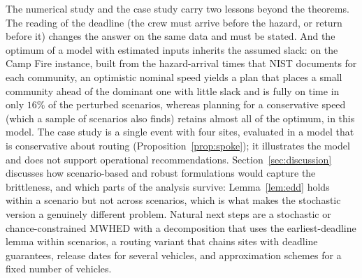 \documentclass[pdflatex,sn-mathphys-ay]{sn-jnl}
\theoremstyle{thmstyleone}
\theoremstyle{thmstyletwo}
\theoremstyle{thmstylethree}
\begin{document}
The numerical study and the case study carry two lessons beyond the
theorems. The reading of the deadline (the crew must arrive before the
hazard, or return before it) changes the answer on the same data and must
be stated. And the optimum of a model with estimated inputs inherits the
assumed slack: on the Camp Fire instance, built from the hazard-arrival
times that NIST documents for each community, an optimistic nominal speed
yields a plan that places a small community ahead of the dominant one with
little slack and is fully on time in only $16\%$ of the perturbed
scenarios, whereas planning for a conservative speed (which a sample of
scenarios also finds) retains almost all of the optimum, in this model. The case
study is a single event with four sites, evaluated in a model that is
conservative about routing (Proposition~\ref{prop:spoke}); it
illustrates the model and does not support operational recommendations.
Section~\ref{sec:discussion} discusses how scenario-based and robust
formulations would capture the brittleness, and which parts of the
analysis survive: Lemma~\ref{lem:edd} holds within a scenario but not
across scenarios, which is what makes the stochastic version a genuinely
different problem. Natural next steps are a stochastic or
chance-constrained MWHED with a decomposition that uses the
earliest-deadline lemma within scenarios, a routing variant that chains
sites with deadline guarantees, release dates for several vehicles, and
approximation schemes for a fixed number of vehicles.
\end{document}
